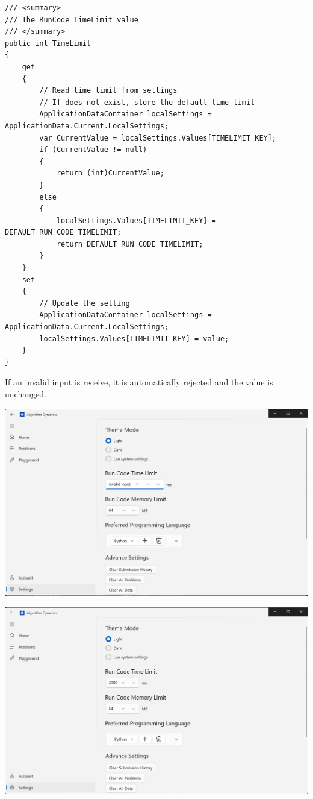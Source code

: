 \documentclass[a4paper]{report}
\begin{document}
\begin{verbatim}
/// <summary>
/// The RunCode TimeLimit value
/// </summary>
public int TimeLimit
{
    get
    {
        // Read time limit from settings
        // If does not exist, store the default time limit
        ApplicationDataContainer localSettings = ApplicationData.Current.LocalSettings;
        var CurrentValue = localSettings.Values[TIMELIMIT_KEY];
        if (CurrentValue != null)
        {
            return (int)CurrentValue;
        }
        else
        {
            localSettings.Values[TIMELIMIT_KEY] = DEFAULT_RUN_CODE_TIMELIMIT;
            return DEFAULT_RUN_CODE_TIMELIMIT;
        }
    }
    set
    {
        // Update the setting
        ApplicationDataContainer localSettings = ApplicationData.Current.LocalSettings;
        localSettings.Values[TIMELIMIT_KEY] = value;
    }
}
\end{verbatim}

If an invalid input is receive, it is automatically rejected and the value is unchanged.

\includegraphics[width=\textwidth, height=\textheight, keepaspectratio]{SettingsPage-TimeLimit-InvalidInput}

\includegraphics[width=\textwidth, height=\textheight, keepaspectratio]{SettingsPage-TimeLimit-Save}
\end{document}
